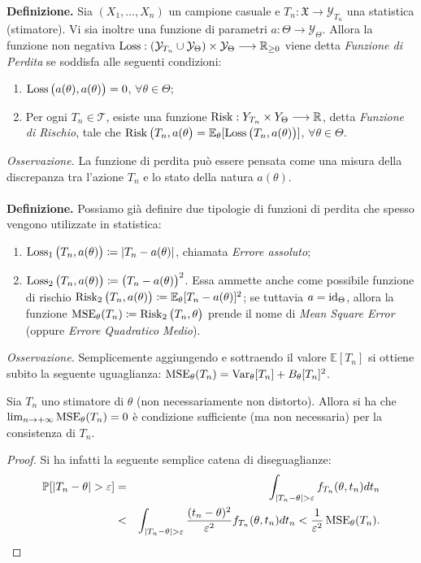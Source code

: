 \textbf{Definizione.} Sia $(X_1,\ldots,X_n)$ un campione casuale e $T_n: \mathfrak{X}\longrightarrow\mathcal{Y}_{T_n}$ una statistica (stimatore). Vi sia inoltre una funzione di parametri $a: \Theta\longrightarrow\mathcal{Y}_{\Theta}$. Allora la funzione non negativa $\operatorname{Loss}: \left(\mathcal{Y}_{T_n}\cup\mathcal{Y}_{\Theta}\right)\times\mathcal{Y}_{\Theta}\longrightarrow \mathbb{R}_{\geq 0}$ viene detta \textit{Funzione di Perdita} se soddisfa alle seguenti condizioni:
\begin{enumerate}[noitemsep]
\item $\operatorname{Loss}\big(a(\theta),a(\theta)\big)=0$, $\forall \theta\in \Theta$;
\item Per ogni $T_n\in \mathcal{T}$, esiste una funzione $\operatorname{Risk}: Y_{T_n}\times Y_{\Theta}\longrightarrow \mathbb{R}$, detta \textit{Funzione di Rischio}, tale che $\operatorname{Risk}\big(T_n,a(\theta\big)=\mathbb{E}_{\theta}[\operatorname{Loss}\big(T_n,a(\theta)\big)]$, $\forall \theta\in \Theta$. 
\end{enumerate}
\textit{Osservazione.} La funzione di perdita può essere pensata come una misura della discrepanza tra l'azione $T_n$ e lo stato della natura $a(\theta)$. \\ \\
\textbf{Definizione.} Possiamo già definire due tipologie di funzioni di perdita che spesso vengono utilizzate in statistica: 
\begin{enumerate}[noitemsep]
\item $\operatorname{Loss}_1\big(T_n,a(\theta)\big)\coloneqq |T_n-a(\theta)|$, chiamata \textit{Errore assoluto};
\item $\operatorname{Loss}_2\big(T_n,a(\theta)\big)\coloneqq \big(T_n-a(\theta)\big)^2$. Essa ammette anche come possibile funzione di rischio $\operatorname{Risk}_2\big(T_n,a(\theta)\big)\coloneqq \mathbb{E}_{\theta}[T_n-a(\theta)]^2$; se tuttavia $a=\operatorname{id}_{\Theta}$, allora la funzione $\operatorname{MSE}_{\theta}(T_n)\coloneqq \operatorname{Risk}_2\big(T_n,\theta\big)$ prende il nome di \textit{Mean Square Error} (oppure \textit{Errore Quadratico Medio}).
\end{enumerate}
\textit{Osservazione.} Semplicemente aggiungendo e sottraendo il valore $\mathbb{E}[T_n]$ si ottiene subito la seguente uguaglianza: $\operatorname{MSE}_{\theta}(T_n)=\operatorname{Var}_\theta [T_n]+B_\theta [T_n]^2$.
\begin{theorem}
Sia $T_n$ uno stimatore di $\theta$ (non necessariamente non distorto). Allora si ha che $\lim_{n\rightarrow +\infty} \operatorname{MSE}_\theta (T_n)=0$ è condizione sufficiente (ma non necessaria) per la consistenza di $T_n.$
\end{theorem}
\begin{proof} Si ha infatti la seguente semplice catena di diseguaglianze: 
\begin{eqnarray*}
\mathbb{P}[|T_n-\theta|>\varepsilon] &=& \int_{|T_n-\theta|>\varepsilon} f_{T_n}(\theta,t_n)dt_n \\ &<& \int_{|T_n-\theta|>\varepsilon} \frac{(t_n-\theta)^2}{\varepsilon^2}f_{T_n}(\theta,t_n)dt_n < \frac{1}{\varepsilon^2}\mse_\theta (T_n).
\end{eqnarray*}
\end{proof}
